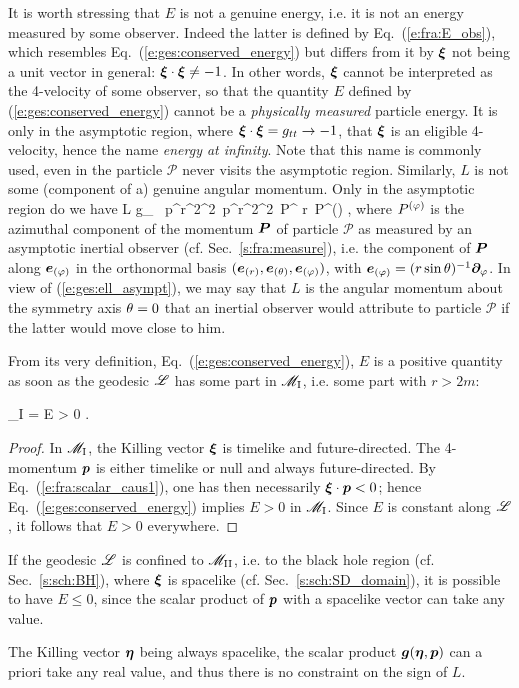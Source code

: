 It is worth stressing that $E$ is not a genuine energy, i.e. it is not
an energy measured by some observer. Indeed the latter is defined by
Eq.~(\ref{e:fra:E_obs}), which resembles Eq.~(\ref{e:ges:conserved_energy})
but differs from it by $\bm{\xi}$ not being a unit vector in general:
$\bm{\xi}\cdot\bm{\xi} \not = -1$. In other words, $\bm{\xi}$ cannot
be interpreted as the 4-velocity of some observer, so that the quantity
$E$ defined by (\ref{e:ges:conserved_energy}) cannot be a \emph{physically measured}
particle energy. It is only in the asymptotic region, where $\bm{\xi}\cdot\bm{\xi} = g_{tt}
\rightarrow -1$, that $\bm{\xi}$ is an eligible 4-velocity, hence the name
\emph{energy at infinity}. Note that this name is commonly used, even in the
particle $\mathscr{P}$ never visits the asymptotic region.
Similarly, $L$ is not some (component of a) genuine angular momentum. Only in the
asymptotic region do we have
\be \label{e:ges:ell_asympt}
    L \simeq g_{\ph\ph} \, p^\ph \simeq r^2\sin^2\ph \, p^\ph \simeq r^2\sin^2\theta \, P^\ph
    \simeq r\sin\th \, P^{(\ph)} ,
\ee
where $P^{(\varphi)}$ is the azimuthal component of the momentum $\bm{P}$ of particle $\mathscr{P}$
as measured by an asymptotic inertial observer (cf. Sec.~\ref{s:fra:measure}), i.e.
the component of $\bm{P}$ along $\bm{e}_{(\varphi)}$ in the orthonormal basis $(\bm{e}_{(r)}, \bm{e}_{(\theta)}, \bm{e}_{(\varphi)})$, with $\bm{e}_{(\varphi)} = (r\sin\theta)^{-1} \bm{\partial}_\varphi$.
In view of (\ref{e:ges:ell_asympt}), we may say that $L$ is the angular momentum
about the symmetry axis $\theta=0$ that an inertial observer would attribute to
particle $\mathscr{P}$ if the latter would move close to him.

From its very definition, Eq.~(\ref{e:ges:conserved_energy}), $E$ is
a positive
quantity as soon as the geodesic $\mathscr{L}$ has some part in $\mathscr{M}_{\rm I}$, i.e.
some part with $r>2m$:
\begin{greybox}
\be \label{e:ges:E_positive_M_I}
    \Li \cap \M_{\rm I} \not= \varnothing \quad \Longrightarrow \quad E > 0 .
\ee
\end{greybox}
\begin{proof}
In $\mathscr{M}_{\rm I}$, the Killing vector $\bm{\xi}$ is timelike and future-directed.
The 4-momentum $\bm{p}$ is either timelike or null and always future-directed.
By Eq.~(\ref{e:fra:scalar_caus1}), one has then necessarily $\bm{\xi}\cdot\bm{p} < 0$; hence Eq.~(\ref{e:ges:conserved_energy})
implies $E > 0$ in $\mathscr{M}_{\rm I}$. Since $E$ is constant along $\mathscr{L}$, it
follows that $E > 0$ everywhere.
\end{proof}
\begin{remark}
If the geodesic $\mathscr{L}$ is confined to $\mathscr{M}_{\rm II}$, i.e. to the black hole
region (cf. Sec.~\ref{s:sch:BH}),
where $\bm{\xi}$ is spacelike (cf. Sec.~\ref{s:sch:SD_domain}),
it is possible to have $E \leq 0$, since the
scalar product of $\bm{p}$ with a spacelike vector can take any value.
\end{remark}
\begin{remark}\label{r:ges:L_any_sign}
The Killing vector $\bm{\eta}$ being always spacelike,
the scalar product $\bm{g}(\bm{\eta},\bm{p})$ can a priori take any real value, and
thus there is no constraint
on the sign of $L$.
\end{remark}

